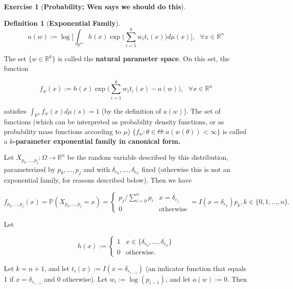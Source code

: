 \documentclass{article}
\theoremstyle{definition}
\newtheorem{exercise}{Exercise}
\newtheorem{definition}{Definition}
\theoremstyle{definition}
\theoremstyle{definition}
\theoremstyle{definition}
\begin{document}
\begin{exercise}[\textbf{Probability; Wen says we should do this}]
\begin{enumerate}[(a)]
\begin{center}
{{\begin{definition}[\textbf{Exponential Family}]
\[
a(w) := \log \bigg[ \int_{\mathbb{R}^n} h(x) \exp \bigg( \sum_{i=1}^k w_i t_i(x) \bigg) d \mu(x) \bigg], \ \ \ \forall x \in \mathbb{R}^n
\]

The set \(\{w \in \mathbb{R}^k\}\) is called the \textbf{natural parameter space}. On this set, the function

\[
f_w(x) := h(x) \exp \bigg( \sum_{i=1}^k w_i t_i(x) - a(w) \bigg), \ \ \ \forall x \in \mathbb{R}^n
\]

satisfies \(\int_{\mathbb{R}^n} f_w(x) d \mu(s) = 1\) (by the definition of \(a(w)\)). The set of functions (which can be interpreted as probability density functions, or as probability mass functions according to \(\mu\)) \(\{f_w: \theta \in \Theta: a(w(\theta)) < \infty \}\) is called a \textbf{\(k\)-parameter exponential family in canonical form.} 
 
% 
% 
 
\end{definition}
}
}
\end{center}

Let \(X_{p_0, \ldots, p_j}: \Omega \to \mathbb{R}^n\) be the random variable described by this distribution, parameterized by \(p_0, \ldots, p_j\) and with \(\delta_{e_0}, \ldots, \delta_{e_n}\) fixed (otherwise this is not an exponential family, for reasons described below). Then we have

\[
f_{p_0, \ldots, p_j} (x) = \mathbb{P}(X_{p_0, \ldots, p_j} = x) = \begin{cases}
p_j/\sum_{i=0}^n p_i & x = \delta_{e_j} \\
0 & \text{otherwise}
\end{cases} =  I(x = \delta_{e_{k}}) p_{k}, k \in \{ 0, 1, \ldots, n\}.
\]

Let

\[
h(x) := \begin{cases}
1 & x \in \{\delta_{e_0}, \ldots, \delta_{e_n}\} \\
0 & \text{otherwise.}
\end{cases}
\]

Let \(k = n+1\), and let \(t_i(x) := I(x = \delta_{e_{i-1}})\) (an indicator function that equals 1 if \(x =  \delta_{e_{i-1}}\) and 0 otherwise). Let \(w_i := \log(p_{i-1})\), and let \(a(w) := 0\). Then


\end{enumerate}
\end{exercise}
\end{document}
